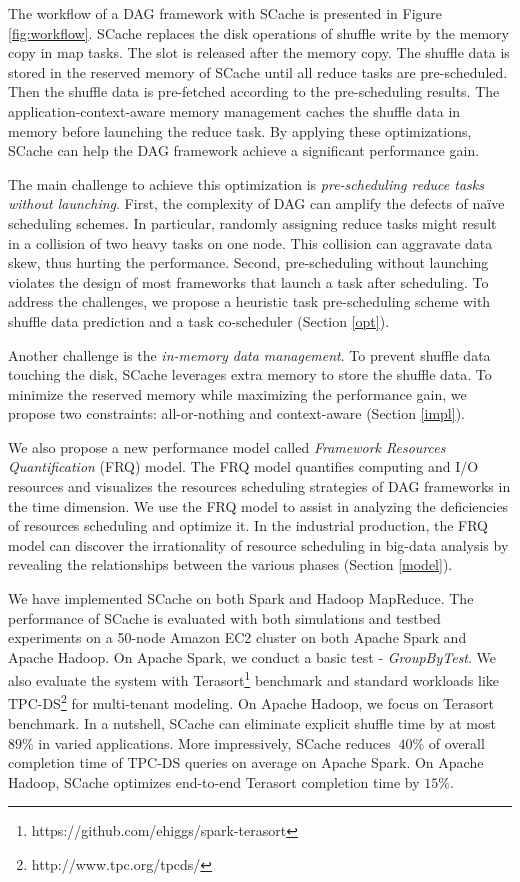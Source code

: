 The workflow of a DAG framework with SCache is presented in Figure \ref{fig:workflow}. 
SCache replaces the disk operations of shuffle write by the memory copy in map tasks. 
The slot is released after the memory copy. 
The shuffle data is stored in the reserved memory of SCache until all reduce tasks are pre-scheduled. 
Then the shuffle data is pre-fetched according to the pre-scheduling results.  
The application-context-aware memory management caches the shuffle data in memory before launching the reduce task.
By applying these optimizations, SCache can help the DAG framework achieve a significant performance gain.  

The main challenge to achieve this optimization is \textit{pre-scheduling reduce tasks without launching}. 
First, the complexity of DAG can amplify the defects of na\"{i}ve scheduling schemes. 
In particular, randomly assigning reduce tasks might result in a collision of two heavy tasks on one node. 
This collision can aggravate data skew, thus hurting the performance. 
Second, pre-scheduling without launching violates the design of most frameworks that launch a task after scheduling.
To address the challenges, we propose a heuristic task pre-scheduling scheme with shuffle data prediction and a task co-scheduler (Section \ref{opt}).

Another challenge is the \textit{in-memory data management}. 
To prevent shuffle data touching the disk, SCache leverages extra memory to store the shuffle data. 
To minimize the reserved memory while maximizing the performance gain, we propose two constraints: all-or-nothing and context-aware (Section \ref{impl}).

{\color{black}
We also propose a new performance model called \textit{Framework Resources Quantification} (FRQ) model. The FRQ model quantifies computing and I/O resources and visualizes the resources scheduling strategies of DAG frameworks in the time dimension. We use the FRQ model to assist in analyzing the deficiencies of resources scheduling and optimize it. 
In the industrial production, the FRQ model can discover the irrationality of resource scheduling in big-data analysis by revealing the relationships between the various phases (Section \ref{model}).
}

{\color{black}
We have implemented SCache on both Spark and Hadoop MapReduce. 
The performance of SCache is evaluated with both simulations and testbed experiments on a 50-node Amazon EC2 cluster on both Apache Spark and Apache Hadoop. On Apache Spark, we conduct a basic test - \textit{GroupByTest}. We also evaluate the system with Terasort\footnote{https://github.com/ehiggs/spark-terasort} benchmark and standard workloads like TPC-DS\footnote{http://www.tpc.org/tpcds/} for multi-tenant modeling. On Apache Hadoop, we focus on Terasort benchmark. In a nutshell, SCache can eliminate explicit shuffle time by at most $89\%$ in varied applications. More impressively, SCache reduces $~40\%$ of overall completion time of TPC-DS queries on average on Apache Spark. On Apache Hadoop, SCache optimizes end-to-end Terasort completion time by $15\%$.
}
